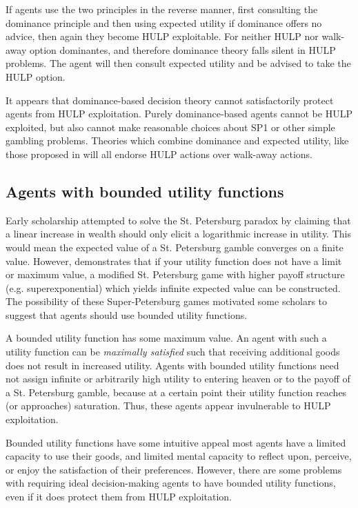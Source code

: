 \documentclass{article}
\begin{document}
If agents use the two principles in the reverse manner, first consulting the dominance principle and then using expected utility if dominance offers no advice, then again they become HULP exploitable. For neither HULP nor walk-away option dominantes, and therefore dominance theory falls silent in HULP problems. The agent will then consult expected utility and be advised to take the HULP option.

It appears that dominance-based decision theory cannot satisfactorily protect agents from HULP exploitation. Purely dominance-based agents cannot be HULP exploited, but also cannot make reasonable choices about SP1 or other simple gambling problems. Theories which combine dominance and expected utility, like those proposed in \citet{colyvan2008relative, colyvan2006no,easwaran2009dominance} will all endorse HULP actions over walk-away actions. 

\subsection{Agents with bounded utility functions}

Early scholarship attempted to solve the St. Petersburg paradox by claiming that a linear increase in wealth should only elicit a logarithmic increase in utility. This would mean the expected value of a St. Petersburg gamble converges on a finite value. However, \citet{menger1934petersburg} demonstrates that if your utility function does not have a limit or maximum value, a modified St. Petersburg game with higher payoff structure (e.g. superexponential) which yields infinite expected value can be constructed. The possibility of these Super-Petersburg games motivated some scholars to suggest that agents should use bounded utility functions.

A bounded utility function has some maximum value. An agent with such a utility function can be \textit{maximally satisfied} such that receiving additional goods does not result in increased utility. Agents with bounded utility functions need not assign infinite or arbitrarily high utility to entering heaven or to the payoff of a St. Petersburg gamble, because at a certain point their utility function reaches (or approaches) saturation. Thus, these agents appear invulnerable to HULP exploitation. 

Bounded utility functions have some intuitive appeal \textemdash{} most agents have a limited capacity to use their goods, and limited mental capacity to reflect upon, perceive, or enjoy the satisfaction of their preferences. However, there are some problems with requiring ideal decision-making agents to have bounded utility functions, even if it does protect them from HULP exploitation.
\end{document}

